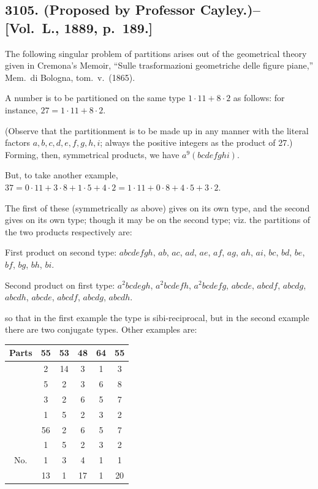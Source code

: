 \documentclass[11pt,a4paper]{article}
\theoremstyle{definition}
\begin{document}
\subsection*{3105. (Proposed by Professor Cayley.)\---[Vol.~L., 1889, p.~189.]}

The following singular problem of partitions arises out of the geometrical theory given in Cremona's Memoir, ``Sulle trasformazioni geometriche delle figure piane,'' Mem.~di Bologna, tom.~v.~(1865).

A number is to be partitioned on the same type $1\cdot11 + 8\cdot2$ as follows: for instance, $27 = 1\cdot11 + 8\cdot2$.

(Observe that the partitionment is to be made up in any manner with the literal factors $a,b,c,d,e,f,g,h,i$; always the positive integers as the product of 27.) Forming, then, symmetrical products, we have $a^9(bcdefghi)$.

But, to take another example, $37 = 0\cdot11 + 3\cdot8 + 1\cdot5 + 4\cdot2 = 1\cdot11 + 0\cdot8 + 4\cdot5 + 3\cdot2$.

The first of these (symmetrically as above) gives on its own type, and the second gives on its own type; though it may be on the second type; viz. the partitions of the two products respectively are:

First product on second type: $abcdefgh$, $ab$, $ac$, $ad$, $ae$, $af$, $ag$, $ah$, $ai$, $bc$, $bd$, $be$, $bf$, $bg$, $bh$, $bi$.

Second product on first type: $a^2bcdegh$, $a^2bcdefh$, $a^2bcdefg$, $abcde$, $abcdf$, $abcdg$, $abcdh$, $abcde$, $abcdf$, $abcdg$, $abcdh$.

so that in the first example the type is sibi-reciprocal, but in the second example there are two conjugate types. Other examples are:

\begin{center}
\begin{tabular}{c|ccccc}
Parts & 55 & 53 & 48 & 64 & 55 \\ \hline
& 2 & 14 & 3 & 1 & 3 \\
& 5 & 2 & 3 & 6 & 8 \\
& 3 & 2 & 6 & 5 & 7 \\
& 1 & 5 & 2 & 3 & 2 \\
& 56 & 2 & 6 & 5 & 7 \\
& 1 & 5 & 2 & 3 & 2 \\ \hline
No. & 1 & 3 & 4 & 1 & 1 \\
& 13 & 1 & 17 & 1 & 20
\end{tabular}
\end{center}
\end{document}
